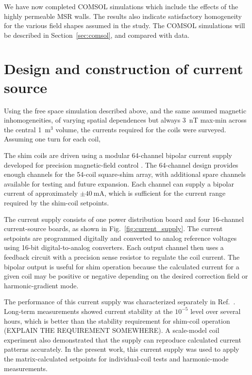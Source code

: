 \documentclass[preprint,12pt]{elsarticle}
\begin{document}
We have now completed COMSOL simulations which include the effects of
the highly permeable MSR walls.  The results also indicate
satisfactory homogeneity for the various field shapes assumed in the
study.  The COMSOL simulations will be described in
Section~\ref{sec:comsol}, and compared with data.

\section{Design and construction of current source}

Using the free space simulation described above, and the same assumed
magnetic inhomogeneities, of varying spatial dependences but always
3~nT max-min across the central 1~m$^3$ volume, the currents required
for the coils were surveyed.  Assuming one turn for each coil, 

The shim coils are driven using a modular 64-channel bipolar current
supply developed for precision magnetic-field control
\cite{bib:AhmedCurrentSupply2026}. The 64-channel design provides
enough channels for the 54-coil square-shim array, with additional
spare channels available for testing and future expansion. Each
channel can supply a bipolar current of approximately $\pm
40~\mathrm{mA}$, which is sufficient for the current range required by
the shim-coil setpoints.

The current supply consists of one power distribution board and four
16-channel current-source boards, as shown in
Fig.~\ref{fig:current_supply}. The current setpoints are programmed
digitally and converted to analog reference voltages using 16-bit
digital-to-analog converters. Each output channel then uses a feedback
circuit with a precision sense resistor to regulate the coil
current. The bipolar output is useful for shim operation because the
calculated current for a given coil may be positive or negative
depending on the desired correction field or harmonic-gradient mode.

The performance of this current supply was characterized separately in
Ref.~\cite{bib:AhmedCurrentSupply2026}. Long-term measurements showed
current stability at the $10^{-5}$ level over several hours, which is
better than the stability requirement for shim-coil operation (EXPLAIN
THE REQUIREMENT SOMEWHERE). A scale-model coil experiment also
demonstrated that the supply can reproduce calculated current patterns
accurately. In the present work, this current supply was used to apply
the matrix-calculated setpoints for individual-coil tests and
harmonic-mode measurements.
\end{document}
